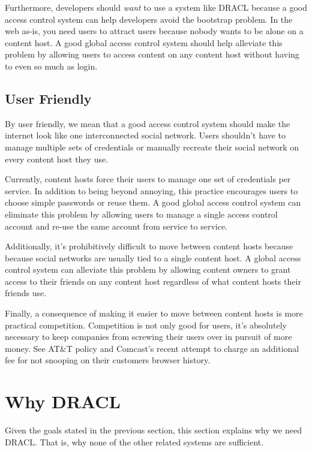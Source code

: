 \documentclass[pdftex,12pt,a4papaer]{report}
\begin{document}
Furthermore, developers should \emph{want} to use a system like DRACL because a
good access control system can help developers avoid the bootstrap problem. In
the web as-is, you need users to attract users because nobody wants to be alone
on a content host. A good global access control system should help alleviate
this problem by allowing users to access content on any content host without
having to even so much as login.

\subsection{User Friendly}
\label{sub:goal-user}

By user friendly, we mean that a good access control system should make the
internet look like one interconnected social network. Users shouldn't have to
manage multiple sets of credentials or manually recreate their social network on
every content host they use.

Currently, content hosts force their users to manage one set of credentials
per service. In addition to being beyond annoying, this practice encourages
users to choose simple passwords or reuse them. A good global access control
system can eliminate this problem by allowing users to manage a single access
control account and re-use the same account from service to service.

Additionally, it's prohibitively difficult to move between content hosts because
because social networks are usually tied to a single content host. A global
access control system can alleviate this problem by allowing content owners to
grant access to their friends on any content host regardless of what content
hosts their friends use.

Finally, a consequence of making it easier to move between content hosts is
more practical competition. Competition is not only good for users, it's
absolutely necessary to keep companies from screwing their users over in pursuit
of more money. See AT\&T\texttrademark{}\cite{att} policy and
Comcast's\texttrademark{}\cite{comcast} recent attempt to charge an additional
fee for not snooping on their customers browser history.

\section{Why DRACL} 

Given the goals stated in the previous section, this section explains why we
need DRACL. That is, why none of the other related systems are sufficient.
\end{document}
